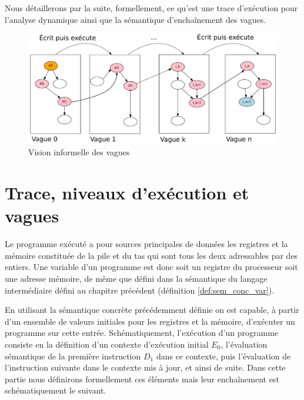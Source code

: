 Nous détaillerons par la suite, formellement, ce qu'est une trace d'exécution pour l'analyse dynamique ainsi que la sémantique d'enchaînement des vagues.

\begin{figure}
 \includegraphics[width=1.0\textwidth]{supports/automodification/phases2_final.pdf}
 \caption{Vision informelle des vagues}
 \label{fig:vagues_visuel}
\end{figure}

\section{Trace, niveaux d'exécution et vagues}
Le programme exécuté a pour sources principales de données les registres et la mémoire constituée de la pile et du tas qui sont tous les deux adressables par des entiers. Une variable d'un programme est donc soit un registre du processeur soit une adresse mémoire, de même que défini dans la sémantique du langage intermédiaire défini au chapitre précédent (définition \ref{def:sem_conc_var}).

En utilisant la sémantique concrète précédemment définie on est capable, à partir d'un ensemble de valeurs initiales pour les registres et la mémoire, d'exécuter un programme sur cette entrée.
Schématiquement, l'exécution d'un programme consiste en la définition d'un contexte d'exécution initial $E_0$, l'évaluation sémantique de la première instruction $D_1$ dans ce contexte, puis l'évaluation de l'instruction suivante dans le contexte mis à jour, et ainsi de suite. Dans cette partie nous définirons formellement ces éléments mais leur enchaînement est schématiquement le suivant.

\begin{center}
\end{center}

